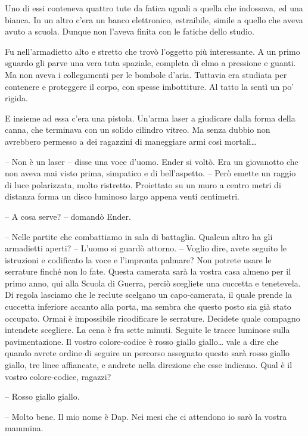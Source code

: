 {Uno di essi conteneva quattro tute da fatica uguali a quella che
	indossava, ed una bianca. In un altro c'era un banco elettronico,
	estraibile, simile a quello che aveva avuto a scuola. Dunque non l'aveva
	finita con le fatiche dello studio.}

{Fu nell'armadietto alto e stretto che trovò l'oggetto più interessante.
	A un primo sguardo gli parve una vera tuta spaziale, completa di elmo a
	pressione e guanti. Ma non aveva i collegamenti per le bombole d'aria.
	Tuttavia era studiata per contenere e proteggere il corpo, con spesse
	imbottiture. Al tatto la sentì un po' rigida.}

{E insieme ad essa c'era una pistola. Un'arma laser a giudicare dalla
	forma della canna, che terminava con un solido cilindro vitreo. Ma senza
	dubbio non avrebbero permesso a dei ragazzini di maneggiare armi così
	mortali\ldots{}}

{-- Non è un laser -- disse una voce d'uomo. Ender si voltò. Era un
	giovanotto che non aveva mai visto prima, simpatico e di bell'aspetto.
	-- Però emette un raggio di luce polarizzata, molto ristretto.
	Proiettato su un muro a centro metri di distanza forma un disco luminoso
	largo appena venti centimetri.}

{-- A cosa serve? -- domandò Ender.}

{-- Nelle partite che combattiamo in sala di battaglia. Qualcun altro ha
	gli armadietti aperti? -- L'uomo si guardò attorno. -- Voglio dire,
	avete seguito le istruzioni e codificato la voce e l'impronta palmare?
	Non potrete usare le serrature finché non lo fate. Questa camerata sarà
	la vostra casa almeno per il primo anno, qui alla Scuola di Guerra,
	perciò scegliete una cuccetta e tenetevela. Di regola lasciamo che le
	reclute scelgano un capo-camerata, il quale prende la cuccetta inferiore
	accanto alla porta, ma sembra che questo posto sia già stato occupato.
	Ormai è impossibile ricodificare le serrature. Decidete quale compagno
	intendete scegliere. La cena è fra sette minuti. Seguite le tracce
	luminose sulla pavimentazione. Il vostro colore-codice è rosso giallo
	giallo\ldots{} vale a dire che quando avrete ordine di seguire un
	percorso assegnato questo sarà rosso giallo giallo, tre linee
	affiancate, e andrete nella direzione che esse indicano. Qual è il
	vostro colore-codice, ragazzi?}

{-- Rosso giallo giallo.}

{-- Molto bene. Il mio nome è Dap. Nei mesi che ci attendono io sarò la
	vostra mammina.}

